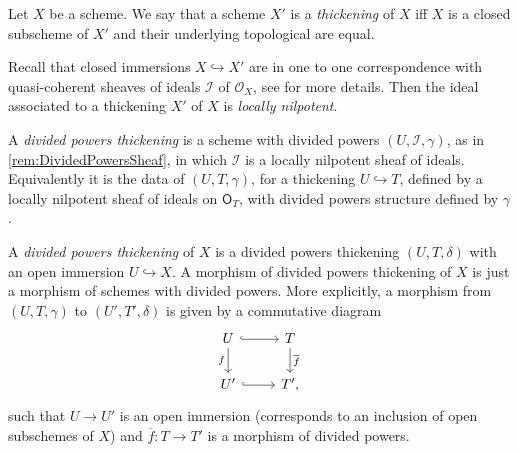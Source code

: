 \documentclass[../Main]{subfiles}
\begin{document}
\begin{defn}[Thickening]
	Let $X$ be a scheme.
	We say that a scheme $X'$ is a {\em thickening} of $X$ iff
	$X$ is a closed subscheme of $X'$ and their underlying topological
	are equal.
\end{defn}


\begin{rem}[]
	Recall that closed immersions $X \hookrightarrow X'$ are in one to
	one correspondence with quasi-coherent sheaves of ideals
	$\mathcal{I}$ of $\mathcal{O}_{ X }$, see
	\cite[\href{https://stacks.math.columbia.edu/tag/01QN}{Section 01QN}]{SP}
	for more details.
	Then the ideal associated to a thickening $X'$ of $X$ 
	is {\em locally nilpotent}.
\end{rem}


\begin{defn}
	A {\em divided powers thickening} is a scheme with divided powers
	$\left(U, \mathcal{I}, \gamma\right)$, as in \cref{rem:DividedPowersSheaf},
	in which $\mathcal{I}$ is a locally nilpotent sheaf of ideals.
	Equivalently it is the data of $\left(U, T, \gamma\right)$,
	for a thickening $U \hookrightarrow T$, defined by a locally nilpotent
	sheaf of ideals on $\mathsf{O}_T$, with divided powers structure
	defined by $\gamma$.
\end{defn}


\begin{defn}[]
	A {\em divided powers thickening} of $X$
	is a divided powers thickening $\left(U, T, \delta\right)$
	with an open immersion $U \hookrightarrow X$.
	A morphism of divided powers thickening of $X$ is just
	a morphism of schemes with divided powers.
	More explicitly, a morphism from $\left(U, T, \gamma\right)$
	to $\left(U', T', \delta\right)$ is given by a commutative
	diagram
	\begin{equation}\label{diag:MorphDivPowers}
	\begin{tikzcd}
		U \arrow[d, "f"', rightarrow] \arrow[r, "", hookrightarrow] &
		T \arrow[d, "\overline{f}", rightarrow] \\
		U' \arrow[r, "", hookrightarrow] &
		T'
	,\end{tikzcd}
	\end{equation}
	such that $U \to U'$ is an open immersion (corresponds to
	an inclusion of open subschemes of $X$) and
	$\overline{f}\colon T \to T'$ is a morphism of divided powers.
\end{defn}
\end{document}
